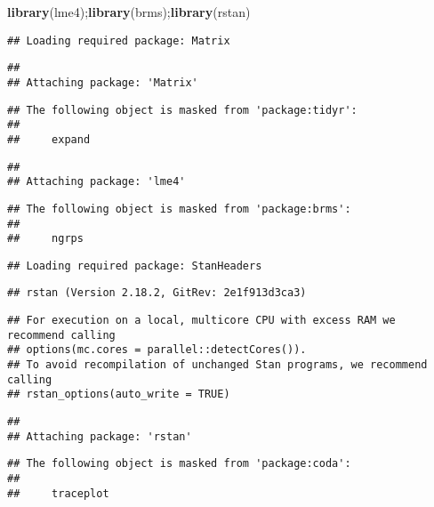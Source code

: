 \documentclass[]{article}
\newenvironment{Shaded}{\begin{snugshade}}{\end{snugshade}}
\newcommand{\KeywordTok}[1]{\textcolor[rgb]{0.13,0.29,0.53}{\textbf{#1}}}
\newcommand{\NormalTok}[1]{#1}
\begin{document}
\begin{Shaded}
\begin{Highlighting}[]
\KeywordTok{library}\NormalTok{(lme4);}\KeywordTok{library}\NormalTok{(brms);}\KeywordTok{library}\NormalTok{(rstan)}
\end{Highlighting}
\end{Shaded}

\begin{verbatim}
## Loading required package: Matrix
\end{verbatim}

\begin{verbatim}
## 
## Attaching package: 'Matrix'
\end{verbatim}

\begin{verbatim}
## The following object is masked from 'package:tidyr':
## 
##     expand
\end{verbatim}

\begin{verbatim}
## 
## Attaching package: 'lme4'
\end{verbatim}

\begin{verbatim}
## The following object is masked from 'package:brms':
## 
##     ngrps
\end{verbatim}

\begin{verbatim}
## Loading required package: StanHeaders
\end{verbatim}

\begin{verbatim}
## rstan (Version 2.18.2, GitRev: 2e1f913d3ca3)
\end{verbatim}

\begin{verbatim}
## For execution on a local, multicore CPU with excess RAM we recommend calling
## options(mc.cores = parallel::detectCores()).
## To avoid recompilation of unchanged Stan programs, we recommend calling
## rstan_options(auto_write = TRUE)
\end{verbatim}

\begin{verbatim}
## 
## Attaching package: 'rstan'
\end{verbatim}

\begin{verbatim}
## The following object is masked from 'package:coda':
## 
##     traceplot
\end{verbatim}
\end{document}
